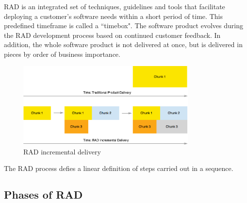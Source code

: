 RAD is an integrated set of techniques, guidelines and tools that facilitate deploying a customer's software needs within a short period of time. This predefined timeframe is called a ``timebox". The software product evolves during the RAD development process based on continued customer feedback. In addition, the whole software product is not delivered at once, but is delivered in pieces by order of business importance. \cite{gottesdiener}

\begin{figure}
	\centering
	\includegraphics[width=0.8\textwidth]{resources/rad-incremental-delivery.png}
	\caption[RAD incremental delivery]{RAD incremental delivery}
\end{figure}



The RAD process defies a linear definition of steps carried out in a sequence. \cite{gottesdiener}

\subsection{Phases of RAD}

